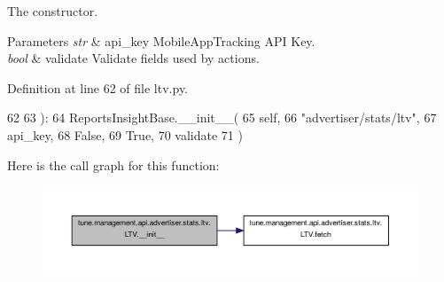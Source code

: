 The constructor. 


\begin{DoxyParams}{Parameters}
{\em str} & api\-\_\-key Mobile\-App\-Tracking A\-P\-I Key. \\
\hline
{\em bool} & validate Validate fields used by actions. \\
\hline
\end{DoxyParams}


Definition at line 62 of file ltv.\-py.


\begin{DoxyCode}
62 
63         ):
64         ReportsInsightBase.\_\_init\_\_(
65             self,
66             \textcolor{stringliteral}{"advertiser/stats/ltv"},
67             api\_key,
68             \textcolor{keyword}{False},
69             \textcolor{keyword}{True},
70             validate
71         )

\end{DoxyCode}


Here is the call graph for this function\-:
\nopagebreak
\begin{figure}[H]
\begin{center}
\leavevmode
\includegraphics[width=350pt]{classtune_1_1management_1_1api_1_1advertiser_1_1stats_1_1ltv_1_1LTV_af779610e2442bd593981f26fe1da0563_cgraph}
\end{center}
\end{figure}




